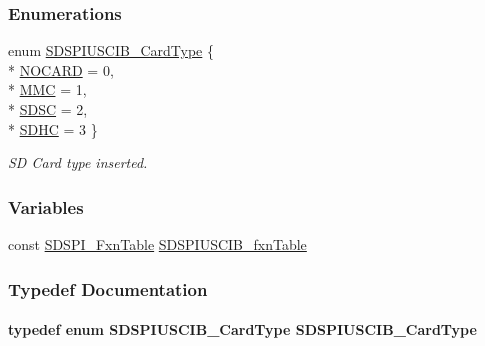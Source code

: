 \subsubsection*{Enumerations}
\begin{DoxyCompactItemize}
\item 
enum \hyperlink{_s_d_s_p_i_u_s_c_i_b_8h_a82051f5c4a349b60bc2205ec32cd74c1}{S\+D\+S\+P\+I\+U\+S\+C\+I\+B\+\_\+\+Card\+Type} \{ \\*
\hyperlink{_s_d_s_p_i_u_s_c_i_b_8h_a82051f5c4a349b60bc2205ec32cd74c1a422cdc20ba86c8cdcf1f0fd2318a1cfc}{N\+O\+C\+A\+R\+D} = 0, 
\\*
\hyperlink{_s_d_s_p_i_u_s_c_i_b_8h_a82051f5c4a349b60bc2205ec32cd74c1aa7d8fca3406f36682514f0384d910fac}{M\+M\+C} = 1, 
\\*
\hyperlink{_s_d_s_p_i_u_s_c_i_b_8h_a82051f5c4a349b60bc2205ec32cd74c1a87550a2102744c14e5e2e0ed39cc04b2}{S\+D\+S\+C} = 2, 
\\*
\hyperlink{_s_d_s_p_i_u_s_c_i_b_8h_a82051f5c4a349b60bc2205ec32cd74c1ab27db2a19a825c3e6f1513cdab7c81ea}{S\+D\+H\+C} = 3
 \}
\begin{DoxyCompactList}\small\item\em S\+D Card type inserted. \end{DoxyCompactList}\end{DoxyCompactItemize}
\subsubsection*{Variables}
\begin{DoxyCompactItemize}
\item 
const \hyperlink{struct_s_d_s_p_i___fxn_table}{S\+D\+S\+P\+I\+\_\+\+Fxn\+Table} \hyperlink{_s_d_s_p_i_u_s_c_i_b_8h_a5d9b8df7b2d67156b569476c6a0e6850}{S\+D\+S\+P\+I\+U\+S\+C\+I\+B\+\_\+fxn\+Table}
\end{DoxyCompactItemize}


\subsubsection{Typedef Documentation}
\paragraph[{S\+D\+S\+P\+I\+U\+S\+C\+I\+B\+\_\+\+Card\+Type}]{\setlength{\rightskip}{0pt plus 5cm}typedef enum {\bf S\+D\+S\+P\+I\+U\+S\+C\+I\+B\+\_\+\+Card\+Type}  {\bf S\+D\+S\+P\+I\+U\+S\+C\+I\+B\+\_\+\+Card\+Type}}\label{_s_d_s_p_i_u_s_c_i_b_8h_a802d35208b5fda397e7de76e62db1b7c}


